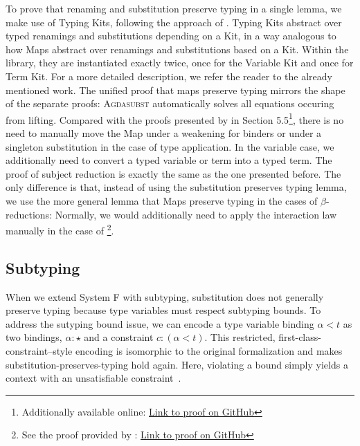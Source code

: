 \documentclass[screen,nonacm]{acmart}
\begin{document}
\noindent To prove that renaming and substitution preserve typing in a single lemma, we
make use of Typing Kits, following the approach of \citet{saffrich:LIPIcs.ITP.2024.32}. Typing
Kits abstract over typed renamings and substitutions depending on a Kit, in a
way analogous to how Maps abstract over renamings and substitutions based on
a Kit. Within the library, they are instantiated exactly twice, once for the
Variable Kit and once for Term Kit. For a
more detailed description, we refer the reader to the already mentioned work.
The unified proof that maps preserve typing mirrors the shape of the separate
proofs: \SFSPT{}\textsc{Agdasubst} automatically solves all equations occuring
from lifting. Compared with the proofs presented by
\citet{saffrich:LIPIcs.ITP.2024.32} in Section 5.5\footnote{Additionally available online: \href{https://github.com/m0rphism/kitty/blob/bc86948c60f2d827593ad23e539197f9660178aa/src/Kitty/Examples/SystemF/SubjectReduction.agda\#L9}{Link to proof on GitHub}}, there is no need to
manually move the Map under a weakening for binders or under a singleton
substitution in the case of type application.
In the variable case, we additionally need to convert a typed
variable or term into a typed term. The proof of subject reduction is exactly the
same as the one presented before. The only difference is that, instead of using
the substitution preserves typing lemma, we use the more general lemma that
Maps preserve typing in the cases of $β$-reductions: \SFSR{}
Normally, we would additionally need to apply the interaction law manually in
the case of \footnote{See the proof provided by
      \citet{saffrich:LIPIcs.ITP.2024.32}:
      \href{https://github.com/m0rphism/kitty/blob/bc86948c60f2d827593ad23e539197f9660178aa/src/Kitty/Examples/SystemF/SubjectReduction.agda\#L32}{Link
            to proof on GitHub}}.

\subsection*{Subtyping}
When we extend System F with subtyping\cite{CARDELLI19944}, substitution does
not generally preserve typing because type variables must respect subtyping
bounds. To address the sutyping bound issue, we can encode a type variable
binding $α < t$ as two bindings, $α : \star$ and a constraint $c : (α < t)$.
This restricted, first-class-constraint–style encoding is isomorphic to the
original formalization and makes substitution-preserves-typing hold again.
Here, violating a bound simply yields a context with an unsatisfiable
constraint~\cite{saffrich:LIPIcs.ITP.2024.32}.
\end{document}
